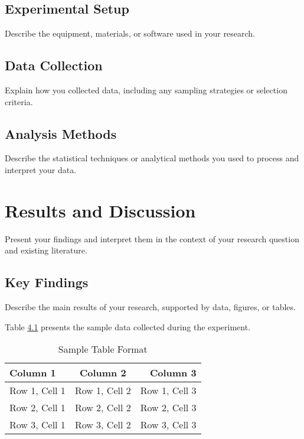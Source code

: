 \documentclass[12pt,a4paper]{report}
\begin{document}
\section{Experimental Setup}
Describe the equipment, materials, or software used in your research.

\section{Data Collection}
Explain how you collected data, including any sampling strategies or selection criteria.

\section{Analysis Methods}
Describe the statistical techniques or analytical methods you used to process and interpret your data.

\chapter{Results and Discussion}
Present your findings and interpret them in the context of your research question and existing literature.

\section{Key Findings}
Describe the main results of your research, supported by data, figures, or tables.

Table \ref{tab:sample_table} presents the sample data collected during the experiment.

\begin{table}[ht]
    \centering
    \caption{Sample Table Format}  %
    \label{tab:sample_table}       %
    \begin{tabular}{|l|c|r|}       %
        \hline
        \textbf{Column 1} & \textbf{Column 2} & \textbf{Column 3} \\
        \hline
        Row 1, Cell 1 & Row 1, Cell 2 & Row 1, Cell 3 \\
        Row 2, Cell 1 & Row 2, Cell 2 & Row 2, Cell 3 \\
        Row 3, Cell 1 & Row 3, Cell 2 & Row 3, Cell 3 \\
        \hline
    \end{tabular}
\end{table}
\end{document}
